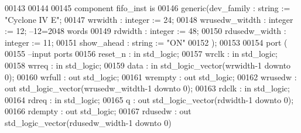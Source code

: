 \begin{DoxyCode}
00143 
00144 
00145 \textcolor{keywordflow}{component} fifo_inst \textcolor{keywordflow}{is}
00146   \textcolor{keywordflow}{generic}(dev_family         : \textcolor{comment}{string}  := \textcolor{keyword}{"Cyclone IV E"};
00147           wrwidth         : \textcolor{comment}{integer} := \textcolor{vhdllogic}{}\textcolor{vhdllogic}{24};
00148           wrusedw_witdth  : \textcolor{comment}{integer} := \textcolor{vhdllogic}{}\textcolor{vhdllogic}{12}; \textcolor{keyword}{--12=2048 words }
00149           rdwidth         : \textcolor{comment}{integer} := \textcolor{vhdllogic}{}\textcolor{vhdllogic}{48};
00150           rdusedw_width   : \textcolor{comment}{integer} := \textcolor{vhdllogic}{}\textcolor{vhdllogic}{11};
00151           show_ahead      : \textcolor{comment}{string}  := \textcolor{keyword}{"ON"}
00152   );  
00153 
00154   \textcolor{keywordflow}{port} (
00155 \textcolor{keyword}{      --input ports }
00156       reset_n       : \textcolor{keywordflow}{in} \textcolor{comment}{std\_logic};
00157       wrclk         : \textcolor{keywordflow}{in} \textcolor{comment}{std\_logic};
00158       wrreq         : \textcolor{keywordflow}{in} \textcolor{comment}{std\_logic};
00159       data          : \textcolor{keywordflow}{in} \textcolor{comment}{std\_logic\_vector}(wrwidth\textcolor{vhdlchar}{-}\textcolor{vhdllogic}{}\textcolor{vhdllogic}{1} \textcolor{keywordflow}{downto} \textcolor{vhdllogic}{}\textcolor{vhdllogic}{0});
00160       wrfull        : \textcolor{keywordflow}{out} \textcolor{comment}{std\_logic};
00161         wrempty       : \textcolor{keywordflow}{out} \textcolor{comment}{std\_logic};
00162       wrusedw       : \textcolor{keywordflow}{out} \textcolor{comment}{std\_logic\_vector}(wrusedw_witdth\textcolor{vhdlchar}{-}\textcolor{vhdllogic}{}\textcolor{vhdllogic}{1} \textcolor{keywordflow}{downto} \textcolor{vhdllogic}{}\textcolor{vhdllogic}{0});
00163       rdclk          : \textcolor{keywordflow}{in} \textcolor{comment}{std\_logic};
00164       rdreq         : \textcolor{keywordflow}{in} \textcolor{comment}{std\_logic};
00165       q             : \textcolor{keywordflow}{out} \textcolor{comment}{std\_logic\_vector}(rdwidth\textcolor{vhdlchar}{-}\textcolor{vhdllogic}{}\textcolor{vhdllogic}{1} \textcolor{keywordflow}{downto} \textcolor{vhdllogic}{}\textcolor{vhdllogic}{0});
00166       rdempty       : \textcolor{keywordflow}{out} \textcolor{comment}{std\_logic};
00167       rdusedw       : \textcolor{keywordflow}{out} \textcolor{comment}{std\_logic\_vector}(rdusedw_width\textcolor{vhdlchar}{-}\textcolor{vhdllogic}{}\textcolor{vhdllogic}{1} \textcolor{keywordflow}{downto} \textcolor{vhdllogic}{}\textcolor{vhdllogic}{0})     

\end{DoxyCode}
